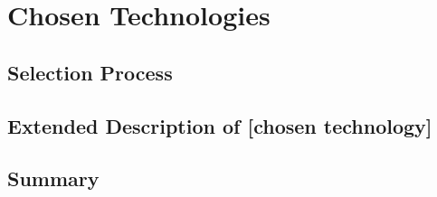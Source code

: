 \documentclass[../Main.tex]{subfiles}
\begin{document}
\section{Chosen Technologies}
\label{chap:chosen_tech}

\subsection{Selection Process}
\subsection{Extended Description of [chosen technology]}
\subsection{Summary}

\biblio %
\end{document}
